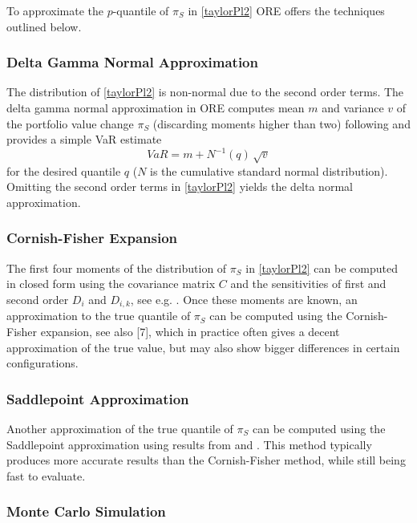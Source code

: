 \documentclass[12pt, a4paper]{article}
\begin{document}
{\begin{appendix}
To approximate the $p$-quantile of $\pi_S$ in \eqref{taylorPl2} ORE offers the techniques outlined below.

\subsubsection*{Delta Gamma Normal Approximation}
 
The distribution of \eqref{taylorPl2} is non-normal due to the second order terms. 
The delta gamma normal approximation in ORE computes mean $m$ and variance $v$ of the portfolio value change $\pi_S$ (discarding moments higher than two) following \cite{alexander} and provides a simple VaR estimate 
$$
VaR = m + N^{-1}(q)\,\sqrt{v}
$$
for the desired quantile $q$ ($N$ is the cumulative standard normal distribution). Omitting the second order terms in \eqref{taylorPl2} yields the delta normal approximation.
 
\subsubsection*{Cornish-Fisher Expansion}

The first four moments of the distribution of $\pi_S$ in \eqref{taylorPl2} can be computed in closed form using the covariance matrix $C$ and the sensitivities of first and second order $D_i$
and $D_{i,k}$, see e.g. \cite{alexander}. Once these moments are known, an approximation to the true quantile of $\pi_S$ can be computed using the Cornish-Fisher expansion, see also [7], which in practice often gives a decent approximation of the true value, but may also show bigger differences in certain configurations.

\subsubsection*{Saddlepoint Approximation}

Another approximation of the true quantile of $\pi_S$ can be computed using the Saddlepoint approximation using results from \cite{Lugannani} and \cite{Daniels}. This method typically produces more accurate results than the Cornish-Fisher method, while still being fast to evaluate.

\subsubsection*{Monte Carlo Simulation}


\end{appendix}}
\end{document}
